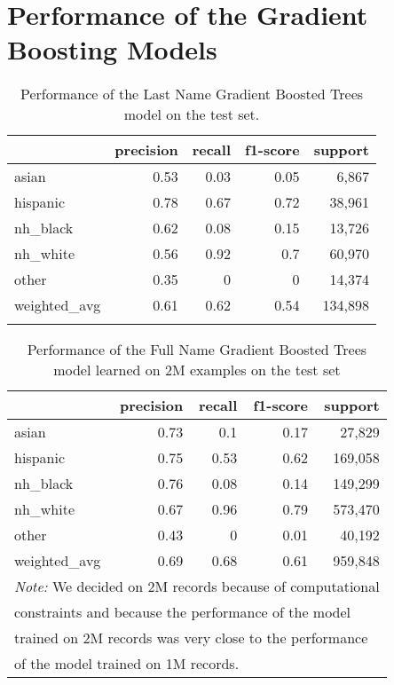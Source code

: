 \documentclass[12pt, letterpaper]{article}
\begin{document}
\clearpage
\section{Performance of the Gradient Boosting Models}\label{gbm_perf}

\begin{table}[h!]
\centering
\caption{Performance of the Last Name Gradient Boosted Trees model on the test set.}
\begin{tabular}{lrrrr}
\hline
              &   precision &   recall &   f1-score &   support \\
\hline
 asian       &   0.53       &     0.03 &        0.05 &     6,867\\
 hispanic     &        0.78 &     0.67 &       0.72 &     38,961 \\
 nh\_black     &        0.62 &     0.08 &       0.15 &     13,726 \\
 nh\_white     &        0.56 &     0.92 &       0.7  &     60,970 \\
 other        &        0.35 &     0    &       0    &     14,374 \\
 weighted\_avg &        0.61 &     0.62 &       0.54 &    134,898 \\
\hline
\label{table:gb_last_name}
\end{tabular}
\end{table}

\begin{table}[h!]
\centering
\caption{Performance of the Full Name Gradient Boosted Trees model learned on 2M examples on the test set}
\begin{tabular}{lrrrr}
\hline
              &   precision &   recall &   f1-score &   support \\
\hline
 asian        &        0.73 &     0.1  &       0.17 &     27,829 \\
 hispanic     &        0.75 &     0.53 &       0.62 &    169,058 \\
 nh\_black     &        0.76 &     0.08 &       0.14 &    149,299 \\
 nh\_white     &        0.67 &     0.96 &       0.79 &    573,470 \\
 other        &        0.43 &     0    &       0.01 &     40,192 \\
 weighted\_avg &        0.69 &     0.68 &       0.61 &    959,848 \\
\hline
\multicolumn{5}{l}{\textit{Note:} We decided on 2M records because of computational}\\
\multicolumn{5}{l}{constraints and because the performance of the model}\\
\multicolumn{5}{l}{trained on 2M records was very close to the performance}\\
\multicolumn{5}{l}{of the model trained on 1M records.}
\end{tabular}
\label{table:gb_full_name_2m}
\end{table}
\end{document}
